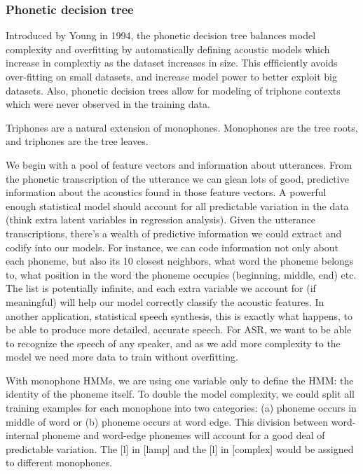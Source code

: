 \documentclass[10pt,a4paper]{article}
\begin{document}
\subsubsection*{Phonetic decision tree}
      
Introduced by Young in 1994, the phonetic decision tree balances model complexity and overfitting by automatically defining acoustic models which increase in complextiy as the dataset increases in size. This effficiently avoids over-fitting on small datasets, and increase model power to better exploit big datasets. Also, phonetic decision trees allow for modeling of triphone contexts which were never observed in the training data.
    
Triphones are a natural extension of monophones. Monophones are the tree roots, and triphones are the tree leaves.

We begin with a pool of feature vectors and information about utterances. From the phonetic transcription of the utterance we can glean lots of good, predictive information about the acoustics found in those feature vectors. A powerful enough statistical model should account for all predictable variation in the data (think extra latent variables in regression analysis). Given the utterance transcriptions, there's a wealth of predictive information we could extract and codify into our models. For instance, we can code information not only about each phoneme, but also its 10 closest neighbors, what word the phoneme belongs to, what position in the word the phoneme occupies (beginning, middle, end) etc. The list is potentially infinite, and each extra variable we account for (if meaningful) will help our model correctly classify the acoustic features. In another application, statistical speech synthesis, this is exactly what happens, to be able to produce more detailed, accurate speech. For ASR, we want to be able to recognize the speech of any speaker, and as we add more complexity to the model we need more data to train without overfitting.

With monophone HMMs, we are using one variable only to define the HMM: the identity of the phoneme itself. To double the model complexity, we could split all training examples for each monophone into two categories: (a) phoneme occurs in middle of word or (b) phoneme occurs at word edge. This division between word-internal phoneme and word-edge phonemes will account for a good deal of predictable variation. The [l] in [lamp] and the [l] in [complex] would be assigned to different monophones.
\end{document}
